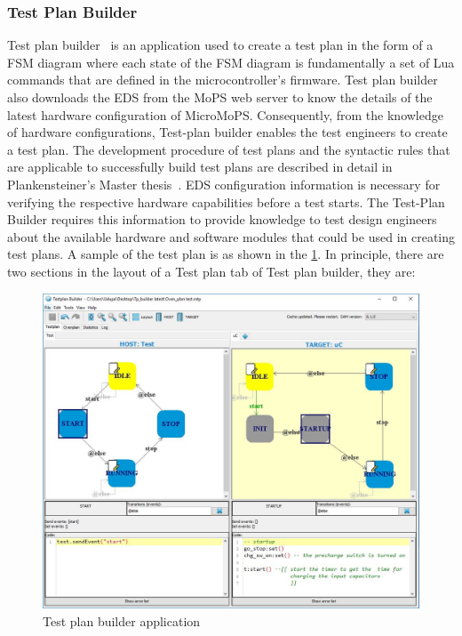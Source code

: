\subsubsection{Test Plan Builder}\label{sec:TP}
Test plan builder~\cite{Plankensteiner2015} is an application used to create a test plan in the form of a \acrshort{FSM} diagram where each state of the FSM diagram is fundamentally a set of Lua commands that are defined in the microcontroller's firmware. 
Test plan builder also downloads the \acrshort{EDS} from the MoPS web server to know the details of the latest hardware configuration of MicroMoPS. Consequently, from the knowledge of hardware configurations, Test-plan builder enables the test engineers to create a test plan. 
The development procedure of test plans and the syntactic rules that are applicable to successfully build test plans are described in detail in Plankensteiner's Master thesis~\cite{Plankensteiner2015}. 
EDS configuration information is necessary for verifying the respective hardware capabilities before a test starts. 
The Test-Plan Builder requires this information to provide knowledge to test design engineers about the available hardware and software modules that could be used in creating test plans. 
A sample of the test plan is as shown in the \cref{fig:Testplan builder}. 
In principle, there are two sections in the layout of a Test plan tab of Test plan builder, they are:  


\begin{figure}[hbt]
		\centering
		\includegraphics[trim=0 0 0 0, clip, width=150mm]{images/TPbuilder.JPG}
		\caption{Test plan builder application}
		\label{fig:Testplan builder}
\end{figure}

